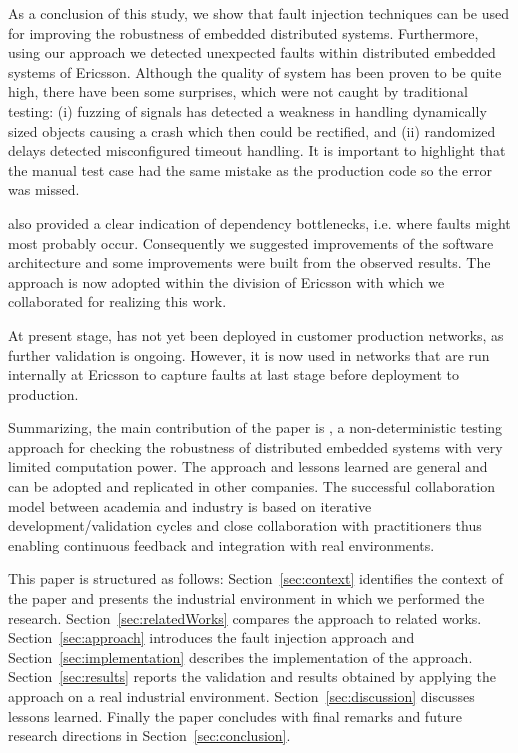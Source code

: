As a conclusion of this study, we show that fault injection techniques can be used for improving the robustness of embedded distributed
systems. Furthermore, using our approach we detected unexpected faults within distributed embedded systems of Ericsson. 
Although the quality of system has been proven to be quite high, there have been some surprises, which were not caught by traditional testing: (i) fuzzing of signals has detected a weakness in handling dynamically sized objects causing a crash which then could be rectified, and (ii) randomized delays detected misconfigured timeout handling. It is important to highlight that the manual test case had the same mistake as the production code so the error was missed.

\approach{} also provided a clear indication of dependency bottlenecks, i.e. where faults might most probably occur. Consequently we suggested improvements of the software architecture and some %
improvements
were built from the observed results. The approach is now adopted within the division of Ericsson with which we collaborated for realizing this work.
 
At present stage, \approach{} has not yet been deployed in customer production networks, as further validation is ongoing. However, it is now used in networks that are run internally at Ericsson to capture faults at last stage before deployment to production. 
 
Summarizing, the main contribution of the paper is \approach{}, a non-deterministic testing approach for checking the robustness of distributed embedded systems with very limited computation power. The approach and lessons learned are general and can be adopted and replicated in other companies.
The successful collaboration model between academia and industry is based on iterative development/validation cycles and close collaboration with practitioners thus enabling continuous feedback and integration with real environments. 

This paper is structured as follows: Section~\ref{sec:context} identifies the context of the paper and presents the industrial environment in which we performed the research. Section~\ref{sec:relatedWorks} compares the approach to related works. Section~\ref{sec:approach} introduces the fault injection approach and Section~\ref{sec:implementation} describes the implementation of the approach. Section~\ref{sec:results} reports the validation and results obtained by applying the approach on a real industrial environment. Section~\ref{sec:discussion} discusses lessons learned. Finally the paper concludes with final remarks and future research directions in Section~\ref{sec:conclusion}.

